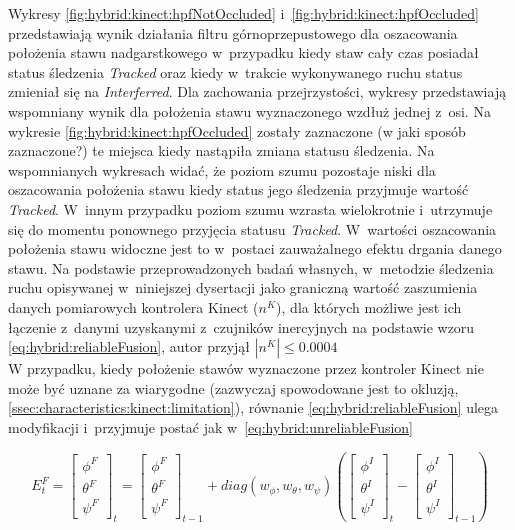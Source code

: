 Wykresy \ref{fig:hybrid:kinect:hpfNotOccluded} i~\ref{fig:hybrid:kinect:hpfOccluded} przedstawiają wynik działania filtru górnoprzepustowego dla oszacowania położenia stawu nadgarstkowego w~przypadku kiedy staw cały czas posiadał status śledzenia \emph{Tracked} oraz kiedy w~trakcie wykonywanego ruchu status zmieniał się na \emph{Interferred}. Dla zachowania przejrzystości, wykresy przedstawiają wspomniany wynik dla położenia stawu wyznaczonego wzdłuż jednej z~osi. Na wykresie \ref{fig:hybrid:kinect:hpfOccluded} zostały zaznaczone (w jaki sposób zaznaczone?) te miejsca kiedy nastąpiła zmiana statusu śledzenia. Na wspomnianych wykresach widać, że poziom szumu pozostaje niski dla oszacowania położenia stawu kiedy status jego śledzenia przyjmuje wartość \emph{Tracked}. W~innym przypadku poziom szumu wzrasta wielokrotnie i~utrzymuje się do momentu ponownego przyjęcia statusu  \emph{Tracked}. W~wartości oszacowania położenia stawu widoczne jest to w~postaci zauważalnego efektu drgania danego stawu. Na podstawie przeprowadzonych badań własnych, w~metodzie śledzenia ruchu opisywanej w~niniejszej dysertacji jako graniczną wartość zaszumienia danych pomiarowych kontrolera Kinect ($n^K$), dla których możliwe jest ich łączenie z~danymi uzyskanymi z~czujników inercyjnych na podstawie wzoru \eqref{eq:hybrid:reliableFusion}, autor przyjął $|n^K| \le 0.0004$\\

W przypadku, kiedy położenie stawów wyznaczone przez kontroler Kinect nie może być uznane za wiarygodne (zazwyczaj spowodowane jest to okluzją, \ref{ssec:characteristics:kinect:limitation}), równanie \eqref{eq:hybrid:reliableFusion} ulega modyfikacji i~przyjmuje postać jak w~\eqref{eq:hybrid:unreliableFusion} 

\begin{equation} 
	\label{eq:hybrid:unreliableFusion}
	E^F_t = 
	\begin{bmatrix}  \phi^F \\  \theta^F \\  \psi^F \end{bmatrix}_t = 
	\begin{bmatrix}  \phi^F \\  \theta^F \\  \psi^F \end{bmatrix}_{t-1} +
	diag(w_\phi,w_\theta,w_\psi)
	(\begin{bmatrix}  \phi^I \\  \theta^I \\  \psi^I \end{bmatrix}_t -
	\begin{bmatrix}  \phi^I \\  \theta^I \\  \psi^I \end{bmatrix}_{t-1})
\end{equation}


